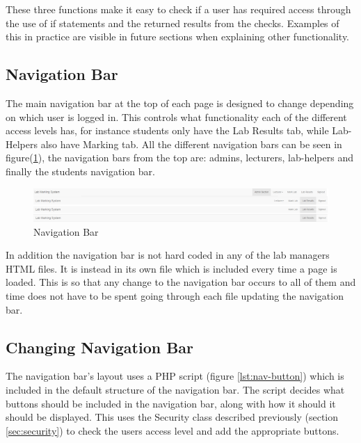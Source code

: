 \documentclass[11pt]{report}
\begin{document}


These three functions make it easy to check if a user has required access through the use of if statements and the returned results from the checks. Examples of this in practice are visible in future sections when explaining other functionality. 


\subsection{Navigation Bar}

The main navigation bar at the top of each page is designed to change depending on which user is logged in. This controls what functionality each of the different access levels has, for instance students only have the Lab Results tab, while Lab-Helpers also have Marking tab. All the different navigation bars can be seen in figure(\ref{fig:nav-all}), the navigation bars from the top are: admins, lecturers, lab-helpers and finally the students navigation bar.  

\begin{figure}[H]
    \centering
    \includegraphics[width=1\textwidth]{images/implementation/nav-all.png}
    \caption{Navigation Bar}
    \label{fig:nav-all}
\end{figure}

\noindent In addition the navigation bar is not hard coded in any of the lab managers HTML files. It is instead in its own file which is included every time a page is loaded. This is so that any change to the navigation bar occurs to all of them and time does not have to be spent going through each file updating the navigation bar.

\subsection*{Changing Navigation Bar}

The navigation bar's layout uses a PHP script (figure \ref{lst:nav-button}) which is included in the default structure of the navigation bar. The script decides what buttons should be included in the navigation bar, along with how it should it should be displayed. This uses the Security class described previously (section \ref{sec:security}) to check the users access level and add the appropriate buttons. 
\end{document}
